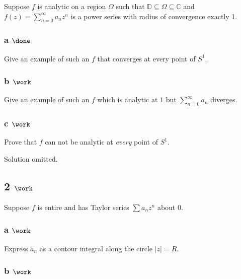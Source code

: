 Suppose \(f\) is analytic on a region \(\Omega\) such that
\({\mathbb{D}}\subseteq \Omega \subseteq {\mathbb{C}}\) and
\(f(z) = \sum_{n=0}^\infty a_n z^n\) is a power series with radius of
convergence exactly 1.

\hypertarget{a-done}{%
\subsubsection{\texorpdfstring{a
\(\done\)}{a \textbackslash done}}\label{a-done}}

Give an example of such an \(f\) that converges at every point of
\(S^1\).

\hypertarget{b-work-3}{%
\subsubsection{\texorpdfstring{b
\(\work\)}{b \textbackslash work}}\label{b-work-3}}

Give an example of such an \(f\) which is analytic at \(1\) but
\(\sum_{n=0}^\infty a_n\) diverges.

\hypertarget{c-work-3}{%
\subsubsection{\texorpdfstring{c
\(\work\)}{c \textbackslash work}}\label{c-work-3}}

Prove that \(f\) can not be analytic at \emph{every} point of \(S^1\).


Solution omitted.

\hypertarget{work-35}{%
\subsection{\texorpdfstring{2
\(\work\)}{2 \textbackslash work}}\label{work-35}}

Suppose \(f\) is entire and has Taylor series \(\sum a_n z^n\) about 0.

\hypertarget{a-work-3}{%
\subsubsection{\texorpdfstring{a
\(\work\)}{a \textbackslash work}}\label{a-work-3}}

Express \(a_n\) as a contour integral along the circle
\({\left\lvert {z} \right\rvert} = R\).

\hypertarget{b-work-5}{%
\subsubsection{\texorpdfstring{b
\(\work\)}{b \textbackslash work}}\label{b-work-5}}

